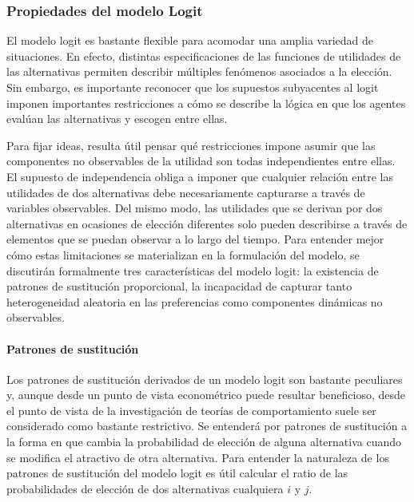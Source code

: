\documentclass[
]{book}
\begin{document}
\hypertarget{propiedades-del-modelo-logit}{%
\subsubsection{Propiedades del modelo Logit}\label{propiedades-del-modelo-logit}}

El modelo logit es bastante flexible para acomodar una amplia variedad de situaciones. En efecto, distintas especificaciones de las funciones de utilidades de las alternativas permiten describir múltiples fenómenos asociados a la elección. Sin embargo, es importante reconocer que los supuestos subyacentes al logit imponen importantes restricciones a cómo se describe la lógica en que los agentes evalúan las alternativas y escogen entre ellas.

Para fijar ideas, resulta útil pensar qué restricciones impone asumir que las componentes no observables de la utilidad son todas independientes entre ellas. El supuesto de independencia obliga a imponer que cualquier relación entre las utilidades de dos alternativas debe necesariamente capturarse a través de variables observables. Del mismo modo, las utilidades que se derivan por dos alternativas en ocasiones de elección diferentes solo pueden describirse a través de elementos que se puedan observar a lo largo del tiempo. Para entender mejor cómo estas limitaciones se materializan en la formulación del modelo, se discutirán formalmente tres características del modelo logit: la existencia de patrones de sustitución proporcional, la incapacidad de capturar tanto heterogeneidad aleatoria en las preferencias como componentes dinámicas no observables.

\hypertarget{patrones-de-sustituciuxf3n}{%
\paragraph*{Patrones de sustitución}\label{patrones-de-sustituciuxf3n}}

Los patrones de sustitución derivados de un modelo logit son bastante peculiares y, aunque desde un punto de vista econométrico puede resultar beneficioso, desde el punto de vista de la investigación de teorías de comportamiento suele ser considerado como bastante restrictivo. Se entenderá por patrones de sustitución a la forma en que cambia la probabilidad de elección de alguna alternativa cuando se modifica el atractivo de otra alternativa. Para entender la naturaleza de los patrones de sustitución del modelo logit es útil calcular el ratio de las probabilidades de elección de dos alternativas cualquiera \(i\) y \(j\).
\end{document}
